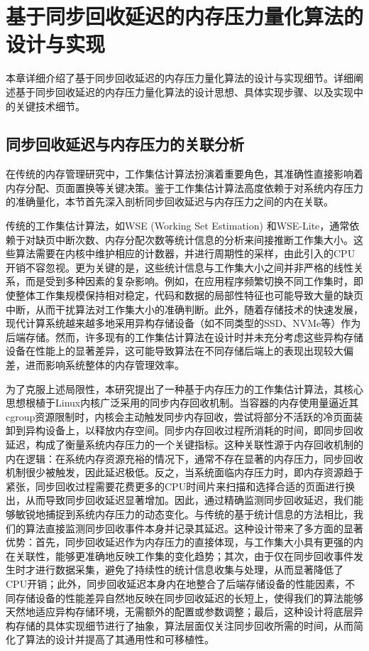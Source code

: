 \chapter{基于同步回收延迟的内存压力量化算法的设计与实现}

本章详细介绍了基于同步回收延迟的内存压力量化算法的设计与实现细节。详细阐述基于同步回收延迟的内存压力量化算法的设计思想、具体实现步骤、以及实现中的关键技术细节。



\section{同步回收延迟与内存压力的关联分析}

在传统的内存管理研究中，工作集估计算法扮演着重要角色，其准确性直接影响着内存分配、页面置换等关键决策。鉴于工作集估计算法高度依赖于对系统内存压力的准确量化，本节首先深入剖析同步回收延迟与内存压力之间的内在关联。

传统的工作集估计算法，如WSE (Working Set Estimation) 和WSE-Lite，通常依赖于对缺页中断次数、内存分配次数等统计信息的分析来间接推断工作集大小。这些算法需要在内核中维护相应的计数器，并进行周期性的采样，由此引入的CPU开销不容忽视。更为关键的是，这些统计信息与工作集大小之间并非严格的线性关系，而是受到多种因素的复杂影响。例如，在应用程序频繁切换不同工作集时，即使整体工作集规模保持相对稳定，代码和数据的局部性特征也可能导致大量的缺页中断，从而干扰算法对工作集大小的准确判断。此外，随着存储技术的快速发展，现代计算系统越来越多地采用异构存储设备（如不同类型的SSD、NVMe等）作为后端存储。然而，许多现有的工作集估计算法在设计时并未充分考虑这些异构存储设备在性能上的显著差异，这可能导致算法在不同存储后端上的表现出现较大偏差，进而影响系统整体的内存管理效率。

为了克服上述局限性，本研究提出了一种基于内存压力的工作集估计算法，其核心思想根植于Linux内核广泛采用的同步内存回收机制。当容器的内存使用量逼近其cgroup资源限制时，内核会主动触发同步内存回收，尝试将部分不活跃的冷页面装卸到异构设备上，以释放内存空间。同步内存回收过程所消耗的时间，即同步回收延迟，构成了衡量系统内存压力的一个关键指标。这种关联性源于内存回收机制的内在逻辑：在系统内存资源充裕的情况下，通常不存在显著的内存压力，同步回收机制很少被触发，因此延迟极低。反之，当系统面临内存压力时，即内存资源趋于紧张，同步回收过程需要花费更多的CPU时间片来扫描和选择合适的页面进行换出，从而导致同步回收延迟显著增加。因此，通过精确监测同步回收延迟，我们能够敏锐地捕捉到系统内存压力的动态变化。与传统的基于统计信息的方法相比，我们的算法直接监测同步回收事件本身并记录其延迟。这种设计带来了多方面的显著优势：首先，同步回收延迟作为内存压力的直接体现，与工作集大小具有更强的内在关联性，能够更准确地反映工作集的变化趋势；其次，由于仅在同步回收事件发生时才进行数据采集，避免了持续性的统计信息收集与处理，从而显著降低了CPU开销；此外，同步回收延迟本身内在地整合了后端存储设备的性能因素，不同存储设备的性能差异自然地反映在同步回收延迟的长短上，使得我们的算法能够天然地适应异构存储环境，无需额外的配置或参数调整；最后，这种设计将底层异构存储的具体实现细节进行了抽象，算法层面仅关注同步回收所需的时间，从而简化了算法的设计并提高了其通用性和可移植性。


